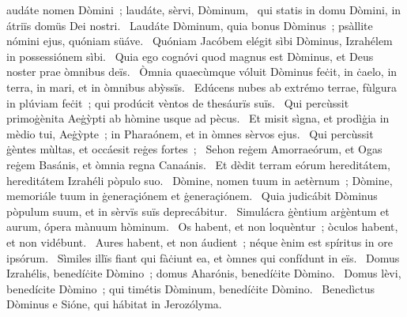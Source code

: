 \psalmChapterWithInscription{}
{ }
{%
audáte nomen Dòmini~; laudáte, sèrvi, Dòminum, 
~qui statis in domu Dòmini, in átriïs domüs Dei nostri. 
~Laudáte Dòminum, quia bonus Dòminus~; psàllite nómini ejus, quóniam süáve. 
~Quóniam Jacóbem elégit sìbi Dòminus, Izrahélem in possessiónem sìbi. 
~Quia ego cognóvi quod magnus est Dòminus, et Deus noster prae òmnibus deïs. 
~Òmnia quaecùmque vóluit Dòminus feċit, in ċaelo, in terra, in mari, et in òmnibus abỳssïs. 
~Edúcens nubes ab extrémo terrae, fùlgura in plúviam feċit~; qui prodúcit vèntos de thesáurïs suïs. 
~Qui percùssit primoġènita Aeġỳpti ab hòmine usque ad pècus. 
~Et misit sìgna, et prodìġia in mèdio tui, Aeġỳpte~; in Pharaónem, et in òmnes sèrvos ejus. 
~Qui percùssit ġèntes mùltas, et occáesit reġes fortes~; 
~Sehon reġem Amorraeórum, et Ogas reġem Basánis, et òmnia regna Canaánis. 
~Et dèdit terram eórum hereditátem, hereditátem Izrahéli pòpulo suo. 
~Dòmine, nomen tuum in aetèrnum~; Dòmine, memoriále tuum in ġeneraçiónem et ġeneraçiónem. 
~Quia judicábit Dòminus pòpulum suum, et in sèrvïs suïs deprecábitur. 
~Simulácra ġèntium arġèntum et aurum, ópera mànuum hòminum. 
~Os habent, et non loquèntur~; òculos habent, et non vidébunt. 
~Aures habent, et non áudient~; néque ènim est spíritus in ore ipsórum. 
~Sìmiles illïs fiant qui fàċiunt ea, et òmnes qui confídunt in eïs. 
~Domus Izrahélis, benedíċite Dòmino~; domus Aharónis, benedíċite Dòmino. 
~Domus lèvi, benedícite Dòmino~; qui timétis Dòminum, benedíċite Dòmino. 
~Benedìctus Dòminus e Sióne, qui hábitat in Jerozólyma. 
}

